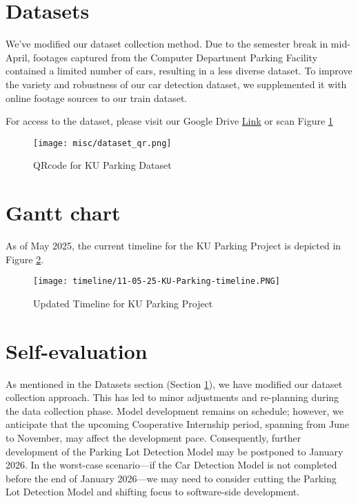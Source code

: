 \section{Datasets}
\label{section:datasets}
We've modified our dataset collection method. Due to the semester break in mid-April, footages captured from the Computer Department Parking Facility contained a limited number of cars, resulting in a less diverse dataset. To improve the variety and robustness of our car detection dataset, we supplemented it with online footage sources to our train dataset.

For access to the dataset, please visit our Google Drive \href{https://drive.google.com/drive/folders/1pOUgcbsFb1mpLc5oywZ2xQdRepm_nVu7?usp=sharing}{Link} or scan Figure \ref{fig:dataset-qr}
\begin{figure}[H]
    \centering
    \texttt{[image: misc/dataset\_qr.png]}
    \caption{QRcode for KU Parking Dataset}
    \label{fig:dataset-qr}
\end{figure}

\section{Gantt chart}
\label{section:gantt-chart}
As of May 2025, the current timeline for the KU Parking Project is depicted in Figure \ref{fig:11-05-25-timeline-dev-progress}.
\begin{figure}[H]
    \centering
    \texttt{[image: timeline/11-05-25-KU-Parking-timeline.PNG]}
    \caption{Updated Timeline for KU Parking Project}
    \label{fig:11-05-25-timeline-dev-progress}
\end{figure}

\section{Self-evaluation}
\label{section:self-evaluation}
As mentioned in the Datasets section (Section \ref{section:datasets}), we have modified our dataset collection approach. This has led to minor adjustments and re-planning during the data collection phase. Model development remains on schedule; however, we anticipate that the upcoming Cooperative Internship period, spanning from June to November, may affect the development pace. Consequently, further development of the Parking Lot Detection Model may be postponed to January 2026. In the worst-case scenario—if the Car Detection Model is not completed before the end of January 2026—we may need to consider cutting the Parking Lot Detection Model and shifting focus to software-side development.